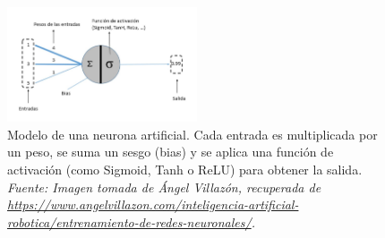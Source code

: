 \documentclass[11pt]{article} %
\begin{document}
\begin{figure}[H]
    \centering
    \includegraphics[width=0.5\textwidth]{Images/111-1.jpg}
    \caption{Modelo de una neurona artificial. Cada entrada es multiplicada por un peso, se suma un sesgo (bias) y se aplica una función de activación (como Sigmoid, Tanh o ReLU) para obtener la salida. \textit{Fuente: Imagen tomada de Ángel Villazón, recuperada de \url{https://www.angelvillazon.com/inteligencia-artificial-robotica/entrenamiento-de-redes-neuronales/}.}}
    \label{fig:neurona-artificial}
\end{figure}
\end{document}

